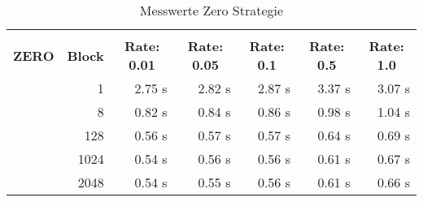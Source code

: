 \begin{table}[!htb]

\begin{tabular}{rrrrrrr}
\hline\\
\multicolumn{0}{c}{\colorbox{myblue}{\textbf{ZERO}}} &  
\multicolumn{0}{c}{\colorbox{myblue}{\textbf{Block}}} &  
\multicolumn{0}{c}{\colorbox{myblue}{\textbf{Rate: 0.01}}} &  
\multicolumn{0}{c}{\colorbox{myblue}{\textbf{Rate: 0.05}}} & 
\multicolumn{0}{c}{\colorbox{myblue}{\textbf{Rate: 0.1}}} &
\multicolumn{0}{c}{\colorbox{myblue}{\textbf{Rate: 0.5}}} & 
\multicolumn{0}{c}{\colorbox{myblue}{\textbf{Rate: 1.0}}}\\
 & 1 & 2.75 s & 2.82 s & 2.87 s & 3.37 s & 3.07 s\\
 & 8 & 0.82 s & 0.84 s & 0.86 s & 0.98 s & 1.04 s \\
 & 128 & 0.56 s & 0.57 s & 0.57 s & 0.64 s & 0.69 s \\ 
 & 1024 & 0.54 s & 0.56 s & 0.56 s & 0.61 s & 0.67 s\\
 & 2048 & 0.54 s & 0.55 s & 0.56 s & 0.61 s & 0.66 s \\
\hline
\end{tabular}

\caption{Messwerte Zero Strategie}
\label{tblZero}
\end{table}

